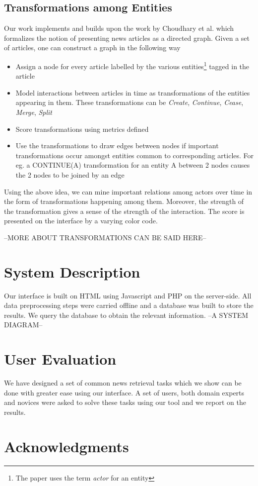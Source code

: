 \documentclass{acm_proc_article-sp}
\begin{document}
\subsection{Transformations among Entities}
Our work implements and builds upon the work by Choudhary et al.\cite{Choudhary07aframework} which formalizes the notion of presenting news articles as a directed graph. Given a set of articles, one can construct a graph in the following way
\begin{itemize}
\item Assign a node for every article labelled by the various entities\footnote{The paper uses the term \emph{actor} for an entity} tagged in the article
\item Model interactions between articles in time as transformations of the entities appearing in them. These transformations can be \emph{Create}, \emph{Continue}, \emph{Cease}, \emph{Merge}, \emph{Split}
\item Score transformations using metrics defined
\item Use the transformations to draw edges between nodes if important transformations occur amongst entities common to corresponding articles. For eg. a CONTINUE(A) transformation for an entity A between 2 nodes causes the 2 nodes to be joined by an edge
\end{itemize}
Using the above idea, we can mine important relations among actors over time in the form of transformations happening among them. Moreover, the strength of the transformation gives a sense of the strength of the interaction. The score is presented on the interface by a varying color code. 

--MORE ABOUT TRANSFORMATIONS CAN BE SAID HERE--
\section{System Description}
Our interface is built on HTML using Javascript and PHP on the server-side. All data preprocessing steps were carried offline and a database was built to store the results. We query the database to obtain the relevant information. 
--A SYSTEM DIAGRAM--
\section{User Evaluation}
We have designed a set of common news retrieval tasks which we show can be done with greater ease using our interface. A set of users, both domain experts and novices were asked to solve these tasks using our tool and we report on the results.
\section{Acknowledgments}

%

%
%
\balancecolumns
\end{document}
